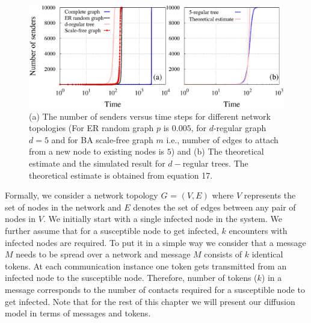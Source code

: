  
 \begin{figure}[htpb]
  \centering
  \includegraphics[scale=0.38]{./texfiles/Chapter_3/epl/figs1/plot_all.eps}
 
 \caption{\label{chapter_5_fig1} (a) The number of senders versus time steps for different network topologies (For ER random graph $p$ is $0.005$, for $d$-regular graph $d=5$ and for BA scale-free graph $m$ i.e., number of edges to attach from a new node to existing nodes is $5$) and 
 (b) The theoretical estimate and the simulated result for $d-$regular trees. The theoretical estimate is obtained from equation 17.}
 \vspace{.5cm}
\end{figure}
 
 
Formally, we consider a network topology $G$ = $(V,E)$ where $V$ represents the set of
nodes in the network and $E$ denotes the set of edges between any pair of nodes in $%
V $. We initially start with a single infected node in the system. We
further assume that for a susceptible node to get infected,  $k$ encounters
with infected nodes are required. To put it in a simple way we consider that
a message $M$ needs to be spread over a network and message $M$ consists of $%
k$  identical tokens. At each communication instance one token gets transmitted from an
infected node to the susceptible node. Therefore, number of tokens ($k$) in a
message corresponds to the number of contacts required for a susceptible
node to get infected. Note that for the rest of this chapter we will present
our diffusion model in terms of messages and tokens. 


